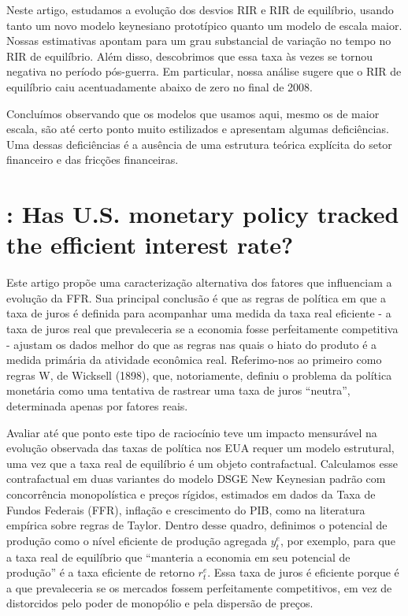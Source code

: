\documentclass[11pt,oneside,a4paper]{article}
\begin{document}
Neste artigo, estudamos a evolução dos desvios RIR e RIR de equilíbrio, usando tanto um novo modelo keynesiano prototípico quanto um modelo de escala maior. Nossas estimativas apontam para um grau substancial de variação no tempo no RIR de equilíbrio. Além disso, descobrimos que essa taxa às vezes se tornou negativa no período pós-guerra. Em particular, nossa análise sugere que o RIR de equilíbrio caiu acentuadamente abaixo de zero no final de 2008.

Concluímos observando que os modelos que usamos aqui, mesmo os de maior escala, são até certo ponto muito estilizados e apresentam algumas deficiências. Uma dessas deficiências é a ausência de uma estrutura teórica explícita do setor financeiro e das fricções financeiras.
%
%
\section{\citet{Curdia:2015}: Has U.S. monetary policy tracked the efficient interest rate? }

Este artigo propõe uma caracterização alternativa dos fatores que influenciam a evolução da FFR. Sua principal conclusão é que as regras de política em que a taxa de juros é definida para acompanhar uma medida da taxa real eficiente - a taxa de juros real que prevaleceria se a economia fosse perfeitamente competitiva - ajustam os dados melhor do que as regras nas quais o hiato do produto é a medida primária da atividade econômica real. Referimo-nos ao primeiro como regras W, de Wicksell (1898), que, notoriamente, definiu o problema da política monetária como uma tentativa de rastrear uma taxa de juros “neutra”, determinada apenas por fatores reais.

Avaliar até que ponto este tipo de raciocínio teve um impacto mensurável na evolução observada das taxas de política nos EUA requer um modelo estrutural, uma vez que a taxa real de equilíbrio é um objeto contrafactual. Calculamos esse contrafactual em duas variantes do modelo DSGE New Keynesian padrão com concorrência monopolística e preços rígidos, estimados em dados da Taxa de Fundos Federais (FFR), inflação e crescimento do PIB, como na literatura empírica sobre regras de Taylor. Dentro desse quadro, definimos o potencial de produção como o nível eficiente de produção agregada $y_t^{e}$, por exemplo, para que a taxa real de equilíbrio que “manteria a economia em seu potencial de produção” é a taxa eficiente de retorno $r_t^{e}$. Essa taxa de juros é eficiente porque é a que prevaleceria se os mercados fossem perfeitamente competitivos, em vez de distorcidos pelo poder de monopólio e pela dispersão de preços.
\end{document}

